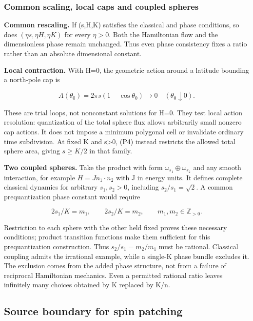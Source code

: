 \documentclass[11pt,a4paper]{article}
\begin{document}
\hypertarget{common-scaling-local-caps-and-coupled-spheres}{%
\subsubsection{Common scaling, local caps and coupled
spheres}\label{common-scaling-local-caps-and-coupled-spheres}}

\textbf{Common rescaling.} If (s,H,K) satisfies the classical and phase
conditions, so does \((\eta s,\eta H,\eta K)\) for every \(\eta>0\).
Both the Hamiltonian flow and the dimensionless phase remain unchanged.
Thus even phase consistency fixes a ratio rather than an absolute
dimensional constant.

\textbf{Local contraction.} With H=0, the geometric action around a
latitude bounding a north-pole cap is

\[A(\theta_0)=2\pi s(1-\cos\theta_0)\longrightarrow0
\quad(\theta_0\downarrow0). \tag{P5}\]

These are trial loops, not nonconstant solutions for H=0. They test
local action resolution: quantization of the total sphere flux allows
arbitrarily small nonzero cap actions. It does not impose a minimum
polygonal cell or invalidate ordinary time subdivision. At fixed K and
s\textgreater0, (P4) instead restricts the allowed total sphere area,
giving \(s\ge K/2\) in that family.

\textbf{Two coupled spheres.} Take the product with form
\(\omega_{s_1}\oplus\omega_{s_2}\) and any smooth interaction, for
example \(H=J n_1\cdot n_2\) with J in energy units. It defines complete
classical dynamics for arbitrary \(s_1,s_2>0\), including
\(s_2/s_1=\sqrt2\). A common prequantization phase constant would
require

\[2s_1/K=m_1,\qquad 2s_2/K=m_2,
\qquad m_1,m_2\in\mathbb Z_{>0}. \tag{P6}\]

Restriction to each sphere with the other held fixed proves these
necessary conditions; product transition functions make them sufficient
for this prequantization construction. Thus \(s_2/s_1=m_2/m_1\) must be
rational. Classical coupling admits the irrational example, while a
single-K phase bundle excludes it. The exclusion comes from the added
phase structure, not from a failure of reciprocal Hamiltonian mechanics.
Even a permitted rational ratio leaves infinitely many choices obtained
by K replaced by K/n.

\hypertarget{source-boundary-for-spin-patching}{%
\subsection{Source boundary for spin
patching}\label{source-boundary-for-spin-patching}}
\end{document}
